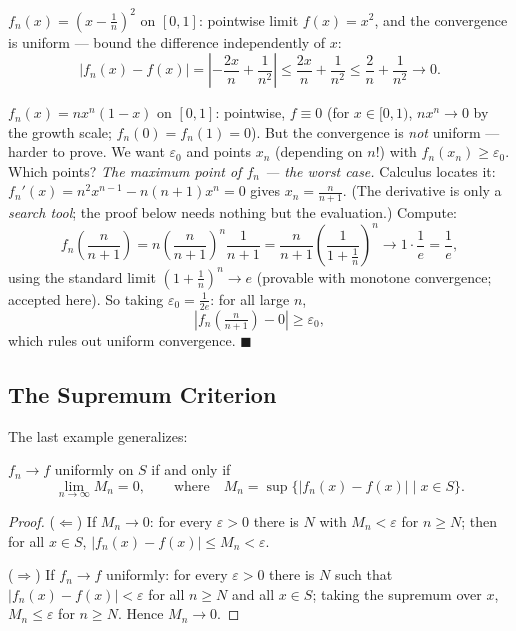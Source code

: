 \documentclass[11pt]{report}
\begin{document}
\begin{exbox}
$f_n(x) = \left(x - \tfrac1n\right)^2$ on $[0,1]$: pointwise limit $f(x) = x^2$, and the convergence is uniform --- bound the difference independently of $x$:
\[
|f_n(x) - f(x)| = \left| -\frac{2x}{n} + \frac{1}{n^2} \right| \leq \frac{2x}{n} + \frac{1}{n^2} \leq \frac2n + \frac{1}{n^2} \longrightarrow 0. \tag*{$\blacksquare$}
\]
\end{exbox}

\begin{exbox}
$f_n(x) = n x^n (1-x)$ on $[0,1]$: pointwise, $f \equiv 0$ (for $x \in [0,1)$, $nx^n \to 0$ by the growth scale; $f_n(0) = f_n(1) = 0$). But the convergence is \emph{not} uniform --- harder to prove. We want $\varepsilon_0$ and points $x_n$ (depending on $n$!) with $f_n(x_n) \geq \varepsilon_0$. Which points? \emph{The maximum point of $f_n$ --- the worst case.} Calculus locates it: $f_n'(x) = n^2 x^{n-1} - n(n+1)x^n = 0$ gives $x_n = \tfrac{n}{n+1}$. (The derivative is only a \emph{search tool}; the proof below needs nothing but the evaluation.) Compute:
\[
f_n\left(\frac{n}{n+1}\right) = n \left(\frac{n}{n+1}\right)^n \frac{1}{n+1}
= \frac{n}{n+1} \left(\frac{1}{1 + \tfrac1n}\right)^n
\longrightarrow 1 \cdot \frac1e = \frac1e,
\]
using the standard limit $\left(1 + \tfrac1n\right)^n \to e$ (provable with monotone convergence; accepted here). So taking $\varepsilon_0 = \tfrac{1}{2e}$: for all large $n$,
\[
\left| f_n\left( \tfrac{n}{n+1} \right) - 0 \right| \geq \varepsilon_0,
\]
which rules out uniform convergence. \hfill $\blacksquare$
\end{exbox}

\subsection{The Supremum Criterion}

The last example generalizes:

\begin{thmbox}
$f_n \to f$ uniformly on $S$ if and only if
\[
\lim_{n\to\infty} M_n = 0, \qquad \text{where} \quad M_n = \sup\{ |f_n(x) - f(x)| \mid x \in S \}.
\]
\end{thmbox}

\begin{proof}
($\Leftarrow$) If $M_n \to 0$: for every $\varepsilon > 0$ there is $N$ with $M_n < \varepsilon$ for $n \geq N$; then for all $x \in S$, $|f_n(x) - f(x)| \leq M_n < \varepsilon$.

($\Rightarrow$) If $f_n \to f$ uniformly: for every $\varepsilon > 0$ there is $N$ such that $|f_n(x) - f(x)| < \varepsilon$ for all $n \geq N$ and all $x \in S$; taking the supremum over $x$, $M_n \leq \varepsilon$ for $n \geq N$. Hence $M_n \to 0$.
\end{proof}
\end{document}
